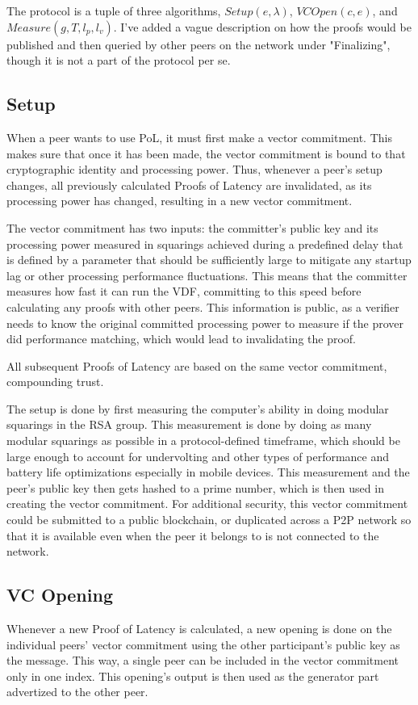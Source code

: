 The protocol is a tuple of three algorithms, \(Setup(e, \lambda)\), \(VCOpen(c, e)\), and \(Measure(g, T, l_p, l_v)\). I've added a vague description on how the proofs would be published and then queried by other peers on the network under "Finalizing", though it is not a part of the protocol per se.

\subsection{Setup}
When a peer wants to use PoL, it must first make a vector commitment. This makes sure that once it has been made, the vector commitment is bound to that cryptographic identity and processing power. Thus, whenever a peer's setup changes, all previously calculated Proofs of Latency are invalidated, as its processing power has changed, resulting in a new vector commitment.

The vector commitment has two inputs: the committer's public key and its processing power measured in squarings achieved during a predefined delay that is defined by a parameter that should be sufficiently large to mitigate any startup lag or other processing performance fluctuations. This means that the committer measures how fast it can run the VDF, committing to this speed before calculating any proofs with other peers. This information is public, as a verifier needs to know the original committed processing power to measure if the prover did performance matching, which would lead to invalidating the proof.

All subsequent Proofs of Latency are based on the same vector commitment, compounding trust.

The setup is done by first measuring the computer's ability in doing modular squarings in the RSA group. This measurement is done by doing as many modular squarings as possible in a protocol-defined timeframe, which should be large enough to account for undervolting and other types of performance and battery life optimizations especially in mobile devices. This measurement and the peer's public key then gets hashed to a prime number, which is then used in creating the vector commitment. For additional security, this vector commitment could be submitted to a public blockchain, or duplicated across a P2P network so that it is available even when the peer it belongs to is not connected to the network.

\subsection{VC Opening}
Whenever a new Proof of Latency is calculated, a new opening is done on the individual peers' vector commitment using the other participant's public key as the message. This way, a single peer can be included in the vector commitment only in one index. This opening's output is then used as the generator part advertized to the other peer.

